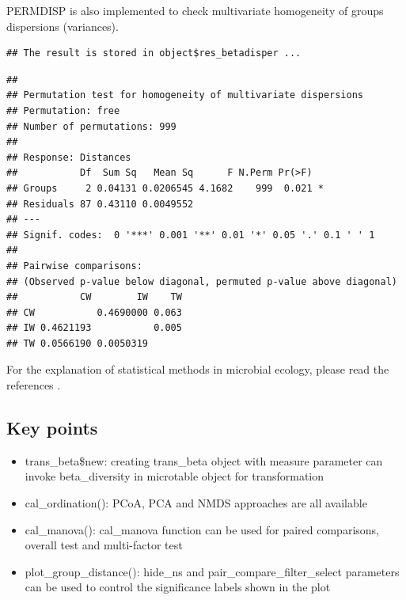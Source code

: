 \documentclass[
]{book}
\newenvironment{Shaded}{\begin{snugshade}}{\end{snugshade}}
\newcommand{\CommentTok}[1]{\textcolor[rgb]{0.56,0.35,0.01}{\textit{#1}}}
\newcommand{\FunctionTok}[1]{\textcolor[rgb]{0.00,0.00,0.00}{#1}}
\newcommand{\NormalTok}[1]{#1}
\newcommand{\SpecialCharTok}[1]{\textcolor[rgb]{0.00,0.00,0.00}{#1}}
\providecommand{\tightlist}{%
  \setlength{\itemsep}{0pt}\setlength{\parskip}{0pt}}
\begin{document}
PERMDISP\citep{Anderson_Navigating_2011} is also implemented to check multivariate homogeneity of groups dispersions (variances).

\begin{Shaded}
\end{Shaded}

\begin{verbatim}
## The result is stored in object$res_betadisper ...
\end{verbatim}

\begin{Shaded}
\end{Shaded}

\begin{verbatim}
## 
## Permutation test for homogeneity of multivariate dispersions
## Permutation: free
## Number of permutations: 999
## 
## Response: Distances
##           Df  Sum Sq   Mean Sq      F N.Perm Pr(>F)  
## Groups     2 0.04131 0.0206545 4.1682    999  0.021 *
## Residuals 87 0.43110 0.0049552                       
## ---
## Signif. codes:  0 '***' 0.001 '**' 0.01 '*' 0.05 '.' 0.1 ' ' 1
## 
## Pairwise comparisons:
## (Observed p-value below diagonal, permuted p-value above diagonal)
##           CW        IW    TW
## CW           0.4690000 0.063
## IW 0.4621193           0.005
## TW 0.0566190 0.0050319
\end{verbatim}

For the explanation of statistical methods in microbial ecology, please read the references \citep{Ramette_Multivariate_2007, Buttigieg_guide_2014}.

\hypertarget{key-points-4}{%
\subsection{Key points}\label{key-points-4}}

\begin{itemize}
\tightlist
\item
  trans\_beta\$new: creating trans\_beta object with measure parameter can invoke beta\_diversity in microtable object for transformation
\item
  cal\_ordination(): PCoA, PCA and NMDS approaches are all available
\item
  cal\_manova(): cal\_manova function can be used for paired comparisons, overall test and multi-factor test
\item
  plot\_group\_distance(): hide\_ns and pair\_compare\_filter\_select parameters can be used to control the significance labels shown in the plot
\end{itemize}
\end{document}
